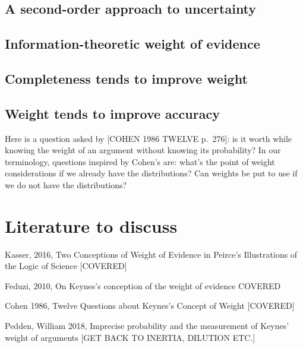 \documentclass[
  10pt,
  dvipsnames,enabledeprecatedfontcommands]{scrartcl}
\begin{document}
\hypertarget{a-second-order-approach-to-uncertainty}{%
\subsection{A second-order approach to
uncertainty}\label{a-second-order-approach-to-uncertainty}}

\hypertarget{information-theoretic-weight-of-evidence}{%
\subsection{Information-theoretic weight of
evidence}\label{information-theoretic-weight-of-evidence}}

\hypertarget{completeness-tends-to-improve-weight}{%
\subsection{Completeness tends to improve
weight}\label{completeness-tends-to-improve-weight}}

\hypertarget{weight-tends-to-improve-accuracy}{%
\subsection{Weight tends to improve
accuracy}\label{weight-tends-to-improve-accuracy}}

Here is a question asked by {[}COHEN 1986 TWELVE p.~276{]}: is it worth
while knowing the weight of an argument without knowing its probability?
In our terminology, questions inspired by Cohen's are: what's the point
of weight considerations if we already have the distributions? Can
weights be put to use if we do not have the distributions?

\hypertarget{literature-to-discuss}{%
\section{Literature to discuss}\label{literature-to-discuss}}

Kasser, 2016, Two Conceptions of Weight of Evidence in Peirce's
Illustrations of the Logic of Science {[}COVERED{]}

Feduzi, 2010, On Keynes's conception of the weight of evidence COVERED

Cohen 1986, Twelve Questions about Keynes's Concept of Weight
{[}COVERED{]}

Pedden, William 2018, Imprecise probability and the measurement of
Keynes' weight of arguments {[}GET BACK TO INERTIA, DILUTION ETC.{]}
\end{document}
